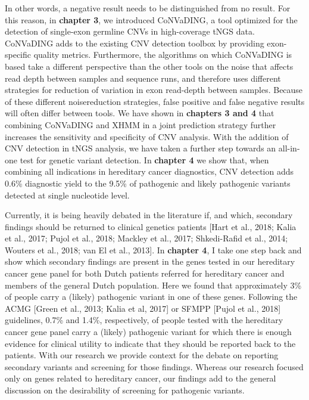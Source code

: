 In other words, a negative result needs to be distinguished from no result. 
For this reason, in \textbf{chapter 3}, we introduced CoNVaDING, a tool optimized for the detection of single-exon germline CNVs in high-coverage tNGS data. 
CoNVaDING adds to the existing CNV detection toolbox by providing exon-specific quality metrics. 
Furthermore, the algorithms on which CoNVaDING is based take a different perspective than the other tools on the noise that affects read depth between samples and sequence runs, and therefore uses different strategies for
reduction of variation in exon read-depth between samples. 
Because of these different noisereduction strategies, false positive and false negative results will often differ between tools. 
We have shown in \textbf{chapters 3 and 4} that combining CoNVaDING and XHMM in a joint prediction strategy further increases the sensitivity and specificity of CNV analysis. 
With the addition of CNV detection in tNGS analysis, we have taken a further step towards an all-in-one test for genetic variant detection.
In \textbf{chapter 4} we show that, when combining all indications in hereditary cancer diagnostics, CNV detection adds 0.6\% diagnostic yield to the 9.5\% of pathogenic and likely pathogenic variants detected at single nucleotide level.

Currently, it is being heavily debated in the literature if, and which, secondary findings should be returned to clinical genetics patients [Hart et al., 2018; Kalia et al., 2017; Pujol et al., 2018;
Mackley et al., 2017; Shkedi-Rafid et al., 2014; Wouters et al., 2018; van El et al., 2013]. 
In \textbf{chapter 4}, I take one step back and show which secondary findings are present in the genes tested in our hereditary cancer gene panel for both Dutch patients referred for hereditary cancer and members of
the general Dutch population. 
Here we found that approximately 3\% of people carry a (likely) pathogenic variant in one of these genes. 
Following the ACMG [Green et al., 2013; Kalia et al, 2017] or SFMPP [Pujol et al., 2018] guidelines, 0.7\% and 1.4\%, respectively, of people tested with the hereditary cancer gene panel carry a (likely) pathogenic variant for which there is enough evidence for clinical utility to indicate that they should be reported back to the patients. 
With our research we provide context for the debate on reporting secondary variants and screening for those findings.
Whereas our research focused only on genes related to hereditary cancer, our findings add to the general discussion on the desirability of screening for pathogenic variants.



